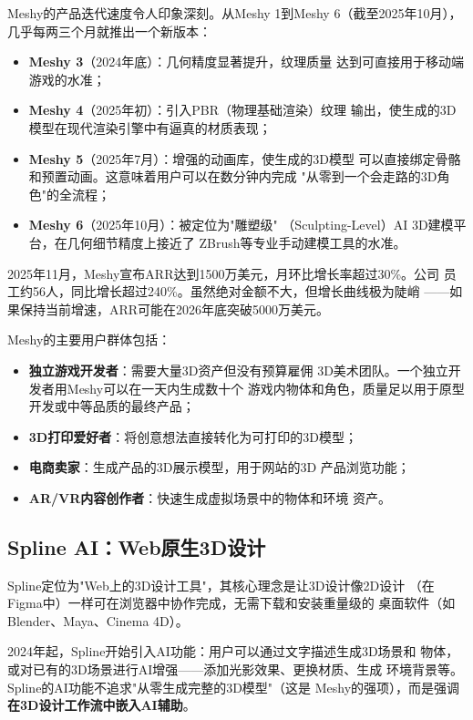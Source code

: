 Meshy的产品迭代速度令人印象深刻。从Meshy 1到Meshy 6（截至2025年10月），
几乎每两三个月就推出一个新版本：

\begin{itemize}
  \item \textbf{Meshy 3}（2024年底）：几何精度显著提升，纹理质量
    达到可直接用于移动端游戏的水准；
  \item \textbf{Meshy 4}（2025年初）：引入PBR（物理基础渲染）纹理
    输出，使生成的3D模型在现代渲染引擎中有逼真的材质表现；
  \item \textbf{Meshy 5}（2025年7月）：增强的动画库，使生成的3D模型
    可以直接绑定骨骼和预置动画。这意味着用户可以在数分钟内完成
    "从零到一个会走路的3D角色"的全流程；
  \item \textbf{Meshy 6}（2025年10月）：被定位为"雕塑级"
    （Sculpting-Level）AI 3D建模平台，在几何细节精度上接近了
    ZBrush等专业手动建模工具的水准。
\end{itemize}

2025年11月，Meshy宣布ARR达到1500万美元，月环比增长率超过30\%。公司
员工约56人，同比增长超过240\%。虽然绝对金额不大，但增长曲线极为陡峭
——如果保持当前增速，ARR可能在2026年底突破5000万美元。

Meshy的主要用户群体包括：
\begin{itemize}
  \item \textbf{独立游戏开发者}：需要大量3D资产但没有预算雇佣
    3D美术团队。一个独立开发者用Meshy可以在一天内生成数十个
    游戏内物体和角色，质量足以用于原型开发或中等品质的最终产品；
  \item \textbf{3D打印爱好者}：将创意想法直接转化为可打印的3D模型；
  \item \textbf{电商卖家}：生成产品的3D展示模型，用于网站的3D
    产品浏览功能；
  \item \textbf{AR/VR内容创作者}：快速生成虚拟场景中的物体和环境
    资产。
\end{itemize}

\subsection{Spline AI：Web原生3D设计}
\label{subsec:spline-ai}

Spline定位为"Web上的3D设计工具"，其核心理念是让3D设计像2D设计
（在Figma中）一样可在浏览器中协作完成，无需下载和安装重量级的
桌面软件（如Blender、Maya、Cinema 4D）。

2024年起，Spline开始引入AI功能：用户可以通过文字描述生成3D场景和
物体，或对已有的3D场景进行AI增强——添加光影效果、更换材质、生成
环境背景等。Spline的AI功能不追求"从零生成完整的3D模型"（这是
Meshy的强项），而是强调\textbf{在3D设计工作流中嵌入AI辅助}。

